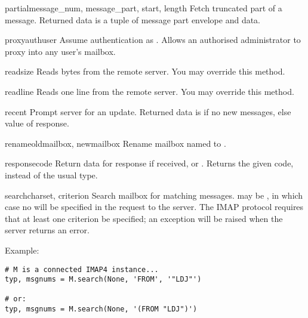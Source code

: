\begin{methoddesc}[IMAP4]{partial}{message_num, message_part, start, length}
  Fetch truncated part of a message.
  Returned data is a tuple of message part envelope and data.
\end{methoddesc}

\begin{methoddesc}[IMAP4]{proxyauth}{user}
  Assume authentication as .
  Allows an authorised administrator to proxy into any user's mailbox.
\end{methoddesc}

\begin{methoddesc}[IMAP4]{read}{size}
  Reads  bytes from the remote server.
  You may override this method.
\end{methoddesc}

\begin{methoddesc}[IMAP4]{readline}{}
  Reads one line from the remote server.
  You may override this method.
\end{methoddesc}

\begin{methoddesc}[IMAP4]{recent}{}
  Prompt server for an update. Returned data is  if no new
  messages, else value of  response.
\end{methoddesc}

\begin{methoddesc}[IMAP4]{rename}{oldmailbox, newmailbox}
  Rename mailbox named  to .
\end{methoddesc}

\begin{methoddesc}[IMAP4]{response}{code}
  Return data for response  if received, or
  . Returns the given code, instead of the usual type.
\end{methoddesc}

\begin{methoddesc}[IMAP4]{search}{charset, criterion}
  Search mailbox for matching messages.   may be
  , in which case no  will be specified in the
  request to the server.  The IMAP protocol requires that at least one
  criterion be specified; an exception will be raised when the server
  returns an error.

  Example:

\begin{verbatim}
# M is a connected IMAP4 instance...
typ, msgnums = M.search(None, 'FROM', '"LDJ"')

# or:
typ, msgnums = M.search(None, '(FROM "LDJ")')
\end{verbatim}
\end{methoddesc}

